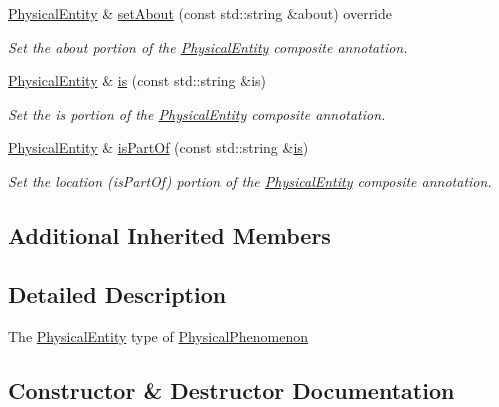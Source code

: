 \begin{DoxyCompactItemize}
\hyperlink{classomexmeta_1_1PhysicalEntity}{Physical\+Entity} \& \hyperlink{classomexmeta_1_1PhysicalEntity_a1736d331705bf2f1569f492fc733949e}{set\+About} (const std\+::string \&about) override
\begin{DoxyCompactList}\small\item\em Set the about portion of the \hyperlink{classomexmeta_1_1PhysicalEntity}{Physical\+Entity} composite annotation. \end{DoxyCompactList}\item 
\hyperlink{classomexmeta_1_1PhysicalEntity}{Physical\+Entity} \& \hyperlink{classomexmeta_1_1PhysicalEntity_a2498e9b0b11a00200e47332c4515b1f1}{is} (const std\+::string \&is)
\begin{DoxyCompactList}\small\item\em Set the {\ttfamily is} portion of the \hyperlink{classomexmeta_1_1PhysicalEntity}{Physical\+Entity} composite annotation. \end{DoxyCompactList}\item 
\hyperlink{classomexmeta_1_1PhysicalEntity}{Physical\+Entity} \& \hyperlink{classomexmeta_1_1PhysicalEntity_a6a68c098a063d5a8416b83ae219eddca}{is\+Part\+Of} (const std\+::string \&\hyperlink{classomexmeta_1_1PhysicalEntity_a2498e9b0b11a00200e47332c4515b1f1}{is})
\begin{DoxyCompactList}\small\item\em Set the location ({\ttfamily is\+Part\+Of}) portion of the \hyperlink{classomexmeta_1_1PhysicalEntity}{Physical\+Entity} composite annotation. \end{DoxyCompactList}\end{DoxyCompactItemize}
\subsection*{Additional Inherited Members}


\subsection{Detailed Description}
The \hyperlink{classomexmeta_1_1PhysicalEntity}{Physical\+Entity} type of \hyperlink{classomexmeta_1_1PhysicalPhenomenon}{Physical\+Phenomenon} 

\subsection{Constructor \& Destructor Documentation}
\mbox{\label{classomexmeta_1_1PhysicalEntity_a9d29348a080c64f91ff6ec184fd45ece}} 
